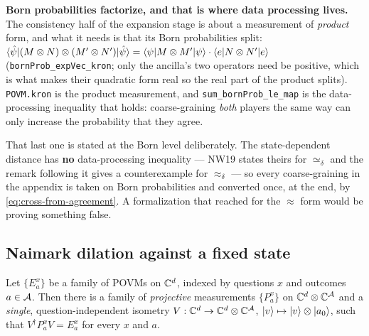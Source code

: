 \textbf{Born probabilities factorize, and that is where data processing lives.} The consistency
half of the expansion stage is about a measurement of \emph{product} form, and what it needs is
that its Born probabilities split: $\langle\hat\psi| (M \otimes N) \otimes (M' \otimes N') |\hat\psi\rangle =
\langle\psi| M \otimes M' |\psi\rangle \cdot \langle e| N \otimes N' |e\rangle$
(\texttt{bornProb\_expVec\_kron}; only the ancilla's two operators need be positive, which is what
makes their quadratic form real so the real part of the product splits). \texttt{POVM.kron} is the
product measurement, and \texttt{sum\_bornProb\_le\_map} is the data-processing inequality that
holds: coarse-graining \emph{both} players the same way can only increase the probability that they
agree.

That last one is stated at the Born level deliberately. The state-dependent distance has
\textbf{no} data-processing inequality --- NW19 states theirs for $\simeq_\delta$ and the remark
following it gives a counterexample for $\approx_\delta$ --- so every coarse-graining in the
appendix is taken on Born probabilities and converted once, at the end, by
\eqref{eq:cross-from-agreement}. A formalization that reached for the $\approx$ form would be
proving something false.

\subsection{Naimark dilation against a fixed state}

\begin{lemma}
\label{lem:naimark-dilation}
\leanok
Let $\{E^x_a\}$ be a family of POVMs on $\mathbb{C}^d$, indexed by questions $x$ and outcomes
$a \in \mathcal{A}$. Then there is a family of \emph{projective} measurements $\{P^x_a\}$ on
$\mathbb{C}^d \otimes \mathbb{C}^{\mathcal{A}}$ and a \emph{single}, question-independent isometry
$V : \mathbb{C}^d \to \mathbb{C}^d \otimes \mathbb{C}^{\mathcal{A}}$, $|v\rangle \mapsto |v\rangle \otimes |a_0\rangle$, such that
$V^\dagger P^x_a V = E^x_a$ for every $x$ and $a$.
\end{lemma}

